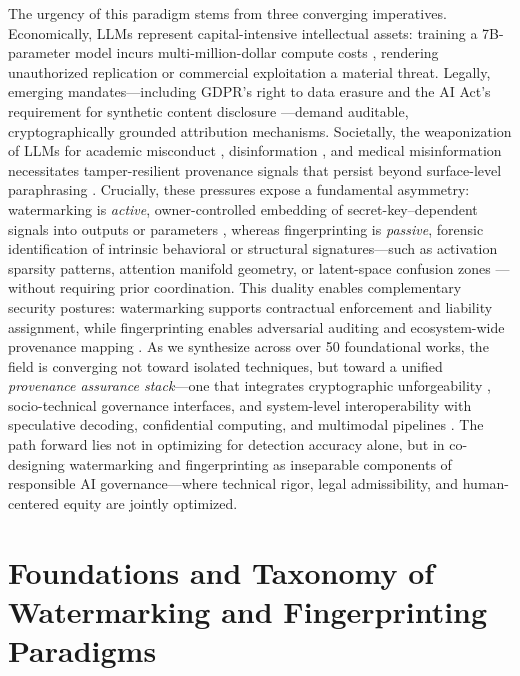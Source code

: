 \documentclass[11pt,a4paper]{article}
\begin{document}
The urgency of this paradigm stems from three converging imperatives. Economically, LLMs represent capital-intensive intellectual assets: training a 7B-parameter model incurs multi-million-dollar compute costs \cite{arxiv:1701.04082}, rendering unauthorized replication or commercial exploitation a material threat. Legally, emerging mandates---including GDPR's right to data erasure \cite{doi:10.1145/3292500.3330885} and the AI Act's requirement for synthetic content disclosure \cite{doi:10.1038/s41586-024-08025-4}---demand auditable, cryptographically grounded attribution mechanisms. Societally, the weaponization of LLMs for academic misconduct \cite{doi:10.1371/journal.pone.0331871}, disinformation \cite{arxiv:2112.04359}, and medical misinformation \cite{doi:10.1038/s41591-024-03445-1} necessitates tamper-resilient provenance signals that persist beyond surface-level paraphrasing \cite{arxiv:2303.13408}. Crucially, these pressures expose a fundamental asymmetry: watermarking is \emph{active}, owner-controlled embedding of secret-key--dependent signals into outputs or parameters \cite{arxiv:1903.01743,doi:10.1145/3649329.3655674}, whereas fingerprinting is \emph{passive}, forensic identification of intrinsic behavioral or structural signatures---such as activation sparsity patterns, attention manifold geometry, or latent-space confusion zones \cite{arxiv:2601.03242}---without requiring prior coordination. This duality enables complementary security postures: watermarking supports contractual enforcement and liability assignment, while fingerprinting enables adversarial auditing and ecosystem-wide provenance mapping \cite{arxiv:2502.00706}. As we synthesize across over 50 foundational works, the field is converging not toward isolated techniques, but toward a unified \emph{provenance assurance stack}---one that integrates cryptographic unforgeability \cite{arxiv:2306.09194}, socio-technical governance interfaces, and system-level interoperability with speculative decoding, confidential computing, and multimodal pipelines \cite{doi:10.1038/s41586-024-08025-4,doi:10.1609/aaai.v37i12.26750,arxiv:2406.03728}. The path forward lies not in optimizing for detection accuracy alone, but in co-designing watermarking and fingerprinting as inseparable components of responsible AI governance---where technical rigor, legal admissibility, and human-centered equity are jointly optimized.


\section{Foundations and Taxonomy of Watermarking and Fingerprinting Paradigms}
\end{document}
